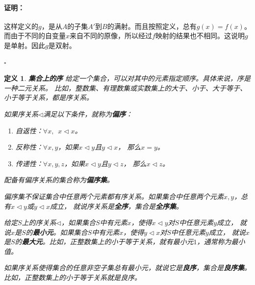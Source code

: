 \documentclass[12pt,UTF8]{ctexbook}
\renewenvironment{proof}{\paragraph{\textbf{证明：}}}{\hfill$\square$}
\newtheorem{df}{定义}[section]
\begin{document}
\begin{appendix}
\begin{proof}
    这样定义的$g$，是从$A$的子集$A'$到$B$的满射。而且按照定义，总有$g(x) = f(x)$。
    而由于不同的自变量$x$来自不同的原像，所以经过$f$映射的结果也不相同。这说明$g$是单射。因此$g$是双射。

\end{proof}

\begin{df}{\textbf{集合上的序}}
    给定一个集合，可以对其中的元素指定顺序。具体来说，序是一种二元关系。
    比如，整数集、有理数集或实数集上的大于、小于、大于等于、小于等于关系，都是序关系。

    如果序关系$\triangleleft$满足以下条件，就称为\textbf{偏序}：
    \begin{enumerate}
        \item 自返性：$\forall x, \,\,\, x \triangleleft x$。
        \item 反称性：$\forall x, y$，如果$x \triangleleft y$且$y \triangleleft x$， 那么$x = y$。
        \item 传递性：$\forall x, y, z$，如果$x \triangleleft y$且$y \triangleleft z$， 那么$x \triangleleft z$。
    \end{enumerate}
    配备有偏序关系的集合称为\textbf{偏序集}。

    偏序集不保证集合中任意两个元素都有序关系。如果集合中任意两个元素$x, y$，总有$x \triangleleft y$或$y \triangleleft x$成立，
    就说序关系是\textbf{全序}，集合是\textbf{全序集}。

    给定$S$上的序关系$\triangleleft$，如果集合$S$中有元素$x$，使得$x \triangleleft y$对$S$中任意元素$y$成立，
    就说$x$是$S$的\textbf{最小元}。如果集合$S$中有元素$x$，使得$y \triangleleft x$对$S$中任意元素$y$成立，
    就说$x$是$S$的\textbf{最大元}。比如，正整数集上的小于等于关系，就有最小元$1$，通常称为最小值。
    
    如果序关系使得集合的任意非空子集总有最小元，就说它是\textbf{良序}，集合是\textbf{良序集}。
    比如，正整数集上的小于等于关系就是良序。


\end{df}


\end{appendix}
\end{document}
